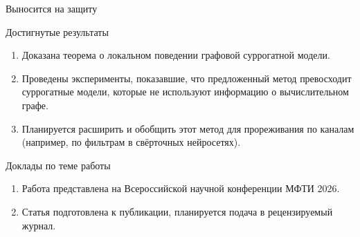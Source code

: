 \documentclass{beamer}
\begin{document}
\begin{frame}{Выносится на защиту}
    \small
    \begin{block}{Достигнутые результаты}
    \begin{enumerate}
      \item Доказана теорема о локальном поведении графовой суррогатной модели.
      \item Проведены эксперименты, показавшие, что предложенный метод превосходит суррогатные модели, которые не используют информацию о вычислительном графе.
      \item Планируется расширить и обобщить этот метод для прореживания по каналам (например, по фильтрам в свёрточных нейросетях).
    \end{enumerate}
    \end{block}
    
    \begin{block}{Доклады по теме работы}
    \begin{enumerate}
        \item Работа представлена на Всероссийской научной конференции МФТИ 2026.
        \item Статья подготовлена к публикации, планируется подача в рецензируемый журнал.
    \end{enumerate}
    \end{block}
\end{frame}
\end{document}
